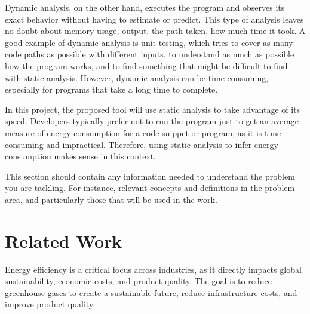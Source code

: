 \documentclass[sigplan]{acmart}
\begin{document}
Dynamic analysis, on the other hand, executes the program and observes its exact behavior without having to estimate or predict. This type of analysis leaves no doubt about memory usage, output, the path taken, how much time it took\cite{ernst2003static}. A good example of dynamic analysis is unit testing, which tries to cover as many code paths as possible with different inputs, to understand as much as possible how the program works, and to find something that might be difficult to find with static analysis. However, dynamic analysis can be time consuming, especially for programs that take a long time to complete.

In this project, the proposed tool will use static analysis to take advantage of its speed. Developers typically prefer not to run the program just to get an average measure of energy consumption for a code snippet or program, as it is time consuming and impractical. Therefore, using static analysis to infer energy consumption makes sense in this context.

This section should contain any information needed to understand the problem you are tackling. For instance, relevant concepts and definitions in the problem area, and particularly those that will be used in the work.

\section{Related Work} \label{sec:relatedwork}

Energy efficiency is a critical focus across industries, as it directly impacts global sustainability, economic costs, and product quality.  The goal is to reduce greenhouse gases to create a sustainable future, reduce infrastructure costs, and improve product quality\cite{annurev:/content/journals/10.1146/annurev.resource.102308.124234}. 
\end{document}
